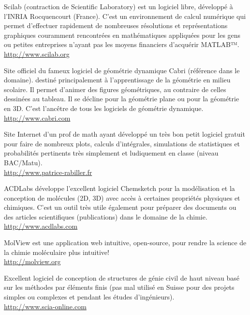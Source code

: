 	{\Large {}}{\Large {}}{\Large {}} Scilab (contraction de Scientific Laboratory) est un logiciel libre, développé à l'INRIA Rocquencourt (France). C'est un environnement de calcul numérique qui permet d'effectuer rapidement de nombreuses résolutions et représentations graphiques couramment rencontrées en mathématiques appliquées pour les gens ou petites entreprises n'ayant pas les moyens financiers d'acquérir MATLAB™.\\
	\href{http://www.scilab.org}{\color{blue}http://www.scilab.org}
	
	{\Large {}}{\Large {}} Site officiel du fameux logiciel de géométrie dynamique Cabri (référence dans le domaine). destiné principalement à l'apprentissage de la géométrie en milieu scolaire. Il permet d'animer des figures géométriques, au contraire de celles dessinées au tableau. Il se décline pour la géométrie plane ou pour la géométrie en 3D. C'est l'ancêtre de tous les logiciels de géométrie dynamique.\\
	\href{http://www.cabri.com}{\color{blue}http://www.cabri.com}
	
	{\Large {}}{\Large {}}{\Large {}}\bcdfrance{}  	Site Internet d'un prof de math ayant développé un très bon petit logiciel gratuit pour faire de nombreux plots, calculs d'intégrales, simulations de statistiques et probabilités pertinents très simplement et ludiquement en classe (niveau BAC/Matu).\\
	\href{http://www.patrice-rabiller.fr}{\color{blue}http://www.patrice-rabiller.fr}
	
	{\Large {}}{\Large {}} ACDLabs développe l'excellent logiciel Chemsketch pour la modélisation et la conception de molécules (2D, 3D) avec accès à certaines propriétés physiques et chimiques. C'est un outil très utile également pour préparer des documents ou des articles scientifiques (publications) dans le domaine de la chimie.\\
	\href{http://www.acdlabs.com}{\color{blue}http://www.acdlabs.com}
	
	{\Large {}}{\Large {}}{\Large {}} MolView est une application web intuitive, open-source, pour rendre la science de la chimie moléculaire plus intuitive!\\
	\href{http://molview.org}{\color{blue}http://molview.org}
	
	{\Large {}}{\Large {}} Excellent logiciel de conception de structures de génie civil de haut niveau basé sur les méthodes par éléments finis (pas mal utilisé en Suisse pour des projets simples ou complexes et pendant les études d'ingénieurs).\\
	\href{http://www.scia-online.com}{\color{blue}http://www.scia-online.com}
	
